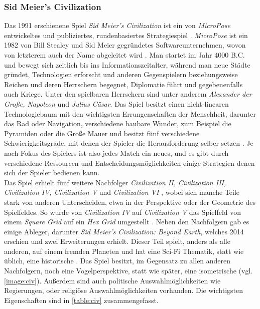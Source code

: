 \subsubsection{Sid Meier's Civilization}
Das 1991 erschienene Spiel \textit{Sid Meier's Civilization} ist ein von \textit{MicroPose} entwickeltes und publiziertes, rundenbasiertes Strategiespiel \cite*[]{civigdb}. \textit{MicroPose} ist ein 1982 von Bill Stealey und Sid Meier gegründetes Softwareunternehmen, wovon von letzterem auch der Name abgeleitet wird \cite*[]{civhistory}. Man startet im Jahr 4000 B.C. und bewegt sich zeitlich bis ins Informationszeitalter, während man neue Städte gründet, Technologien erforscht und anderen Gegenspielern beziehungsweise Reichen und deren Herrschern begegnet, Diplomatie führt und gegebenenfalls auch Kriege. Unter den spielbaren Herrschern sind unter anderem \textit{Alexander der Große, Napoleon} und \textit{Julius Cäsar}. Das Spiel besitzt einen nicht-linearen Technologiebaum mit den wichtigsten Errungenschaften der Menschheit, darunter das Rad oder Navigation, verschiedene baubare Wunder, zum Beispiel die Pyramiden oder die Große Mauer und besitzt fünf verschiedene Schwierigkeitsgrade, mit denen der Spieler die Herausforderung selber setzen \cite*[]{civ}. Je nach Fokus des Spielers ist also jedes Match ein neues, und es gibt durch verschiedene Ressourcen und Entscheidungsmöglichkeiten einige Strategien denen sich der Spieler bedienen kann. \\
Das Spiel erhielt fünf weitere Nachfolger \textit{Civilization II, Civilization III, Civilization IV, Civilization V} und \textit{Civilization VI} \cite*[]{civall}, wobei sich manche Teile stark von anderen Unterscheiden, etwa in der Perspektive oder der Geometrie des Spielfeldes. So wurde von \textit{Civilization IV} auf \textit{Civilization V} das Spielfeld von einem \textit{Square Grid} auf ein \textit{Hex Grid} umgestellt \cite*[]{civallcompare}. Neben den Nachfolgern gab es einige Ableger, darunter \textit{Sid Meier's Civilization: Beyond Earth}, welches 2014 erschien und zwei Erweiterungen erhielt. Dieser Teil spielt, anders als alle anderen, auf einem fremden Planeten und hat eine Sci-Fi Thematik, statt wie üblich, eine historische \cite*[]{civbe}. Das Spiel besitzt, im Gegensatz zu allen anderen Nachfolgern, noch eine Vogelperspektive, statt wie später, eine isometrische (vgl. \autoref{image:civ}). Außerdem sind auch politische Auswahlmöglichkeiten wie Regierungen, oder religiöse Auswahlmöglichkeiten vorhanden. Die wichtigsten Eigenschaften sind in \autoref{table:civ} zusammengefasst.



